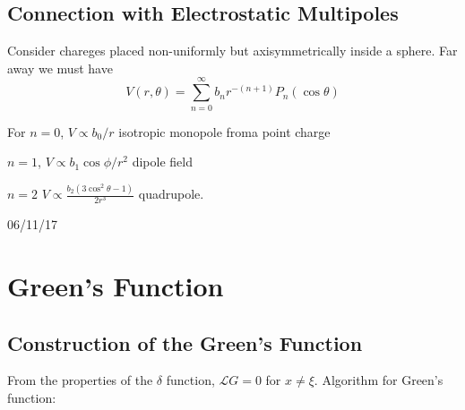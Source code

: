 \documentclass[a4paper]{article}
\renewcommand*{\L}{\mathcal{L}}
\begin{document}
\subsection{Connection with Electrostatic Multipoles}

Consider chareges placed non-uniformly but axisymmetrically inside a sphere. Far away we must have
\[
  V(r, \theta) = \sum_{n = 0}^{\infty} b_n r^{-(n + 1)} P_n(\cos \theta)
\]

For \(n = 0\), \(V \propto b_0/r\) isotropic monopole froma point charge

\(n = 1\), \(V \propto b_1 \cos \phi/r^2\) dipole field

\(n = 2\) \(V \propto \frac{b_2(3 \cos^2 \theta - 1)}{2r^3}\) quadrupole.

06/11/17

\section{Green's Function}

\subsection{Construction of the Green's Function}

From the properties of the \(\delta\) function, \(\L G = 0\) for \(x \neq \xi\). Algorithm for Green's function:
\end{document}

